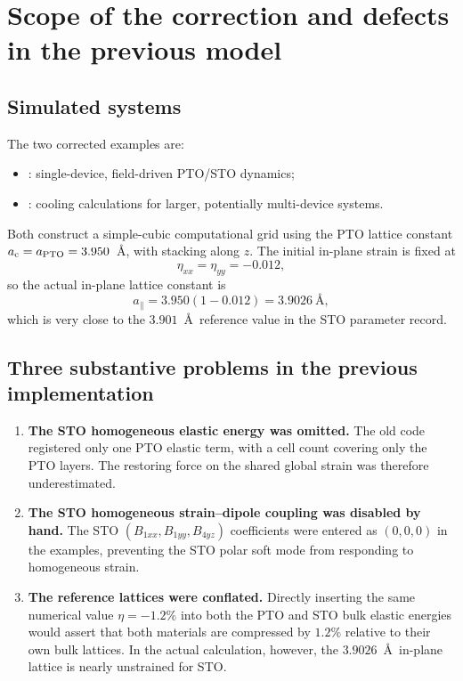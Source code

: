 \documentclass[11pt,a4paper]{article}
\begin{document}
\newpage
{\small\tableofcontents}
\newpage

\section{Scope of the correction and defects in the previous model}

\subsection{Simulated systems}
The two corrected examples are:
\begin{itemize}
  \item {}: single-device, field-driven PTO/STO dynamics;
  \item {}: cooling calculations for larger, potentially multi-device systems.
\end{itemize}
Both construct a simple-cubic computational grid using the PTO lattice constant $a_{\rm c}=a_{\rm PTO}=3.950$~\AA, with stacking along $z$. The initial in-plane strain is fixed at
\begin{equation}
  \eta_{xx}=\eta_{yy}=-0.012,
\end{equation}
so the actual in-plane lattice constant is
\begin{equation}
  a_{\parallel}=3.950(1-0.012)=3.9026~\text{\AA},
\end{equation}
which is very close to the $3.901$~\AA\ reference value in the STO parameter record.

\subsection{Three substantive problems in the previous implementation}
\begin{enumerate}
  \item \textbf{The STO homogeneous elastic energy was omitted.} The old code registered only one PTO elastic term, with a cell count covering only the PTO layers. The restoring force on the shared global strain was therefore underestimated.
  \item \textbf{The STO homogeneous strain--dipole coupling was disabled by hand.} The STO $(B_{1xx},B_{1yy},B_{4yz})$ coefficients were entered as $(0,0,0)$ in the examples, preventing the STO polar soft mode from responding to homogeneous strain.
  \item \textbf{The reference lattices were conflated.} Directly inserting the same numerical value $\eta=-1.2\%$ into both the PTO and STO bulk elastic energies would assert that both materials are compressed by $1.2\%$ relative to their own bulk lattices. In the actual calculation, however, the $3.9026$~\AA\ in-plane lattice is nearly unstrained for STO.
\end{enumerate}
\end{document}

